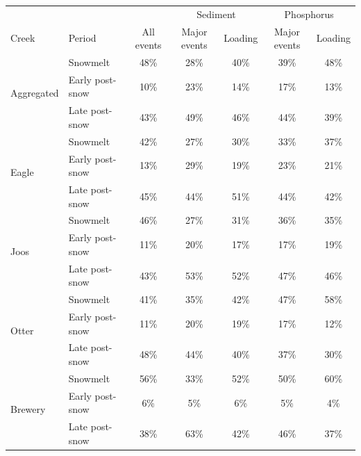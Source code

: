 \documentclass[12pt]{article}
\begin{document}
\begin{table}[h]
    \begin{center}
    \begin{tabular}{llccccc}
        &  &  & \multicolumn{2}{c}{Sediment} & \multicolumn{2}{c}{Phosphorus} \\
        Creek & Period & All events & Major events & Loading & Major events & Loading \\
        \hline 
        \multirow{3}{*}{Aggregated} & Snowmelt & 
        48\% &
        28\% & 
        40\% & 
        39\% & 
        48\% \\
        & Early post-snow & 
        10\% &
        23\% & 
        14\% & 
        17\% & 
        13\% \\
        & Late post-snow & 
        43\% &
        49\% & 
        46\% & 
        44\% & 
        39\% \\
        
        \hline 
        \multirow{3}{*}{Eagle} & Snowmelt & 
        42\% &
        27\% & 
        30\% & 
        33\% & 
        37\% \\
        & Early post-snow & 
        13\% &
        29\% & 
        19\% & 
        23\% & 
        21\% \\
        & Late post-snow & 
        45\% &
        44\% & 
        51\% & 
        44\% & 
        42\% \\
        
        \hline 
        \multirow{3}{*}{Joos} & Snowmelt & 
        46\% &
        27\% & 
        31\% & 
        36\% & 
        35\% \\
        & Early post-snow & 
        11\% &
        20\% & 
        17\% & 
        17\% & 
        19\% \\
        & Late post-snow & 
        43\% &
        53\% & 
        52\% & 
        47\% & 
        46\% \\
        
        \hline 
        \multirow{3}{*}{Otter} & Snowmelt & 
        41\% &
        35\% & 
        42\% & 
        47\% & 
        58\% \\
        & Early post-snow & 
        11\% &
        20\% & 
        19\% & 
        17\% & 
        12\% \\
        & Late post-snow & 
        48\% &
        44\% & 
        40\% & 
        37\% & 
        30\% \\
        
        \hline 
        \multirow{3}{*}{Brewery} & Snowmelt & 
        56\% &
        33\% & 
        52\% & 
        50\% & 
        60\% \\
        & Early post-snow & 
        6\% &
        5\% & 
        6\% & 
        5\% & 
        4\% \\
        & Late post-snow & 
        38\% &
        63\% & 
        42\% & 
        46\% & 
        37\% \\
    \end{tabular}
    \end{center}
\end{table}
\end{document}
